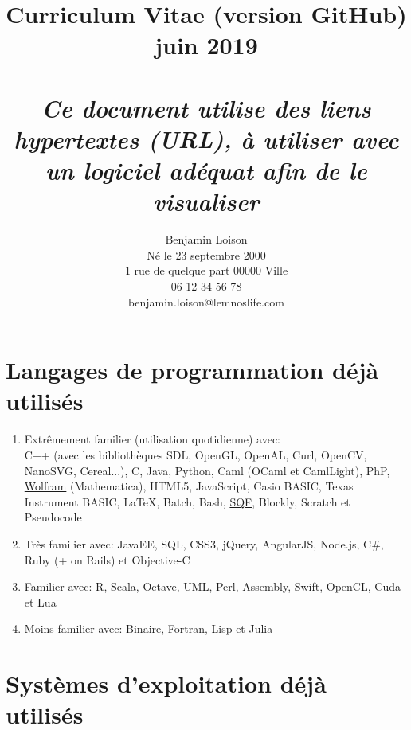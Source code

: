 \documentclass{article}
\makeatletter
\renewcommand{\maketitle}
{
	\bgroup\setlength{\parindent}{0pt}
	\begin{flushleft}\textbf{\@author}\end{flushleft}
	\begin{center}\huge\@title\end{center}
}
\makeatother
\begin{document}
	\author{Benjamin Loison\\
	Né le 23 septembre 2000\\
	1 rue de quelque part 00000 Ville\\
	06 12 34 56 78\\
	benjamin.loison@lemnoslife.com}
	\title{\vspace*{2cm}Curriculum Vitae (version GitHub)\\
	\Large juin 2019\\
	\normalsize \textit{\\Ce document utilise des liens hypertextes (URL), à utiliser avec un logiciel adéquat afin de le visualiser}}
	\maketitle

	\vspace*{1cm}
	\def\contentsname{\empty}
	\tableofcontents

	\vspace*{2cm}

	\section{Langages de programmation déjà utilisés}

		\begin{enumerate}

			\item Extrêmement familier (utilisation quotidienne) avec:\\
				C++ (avec les bibliothèques SDL, OpenGL, OpenAL, Curl, OpenCV, NanoSVG, Cereal...), C, Java, Python, Caml (OCaml et CamlLight), PhP, \href{https://www.wolfram.com/language/elementary-introduction/2nd-ed/}{Wolfram} (Mathematica), HTML5, JavaScript, Casio BASIC, Texas Instrument BASIC, \LaTeX, Batch, Bash, \href{https://community.bistudio.com/wiki/SQF\_syntax}{SQF}, Blockly, Scratch et Pseudocode
			\item Très familier avec: JavaEE, SQL, CSS3, jQuery, AngularJS, Node.js, C\#, Ruby (+ on Rails) et Objective-C
			\item Familier avec: R, Scala, Octave, UML, Perl, Assembly, Swift, OpenCL, Cuda et Lua
			\item Moins familier avec: Binaire, Fortran, Lisp et Julia 

		\end{enumerate}

	\section{Systèmes d'exploitation déjà utilisés}
\end{document}

